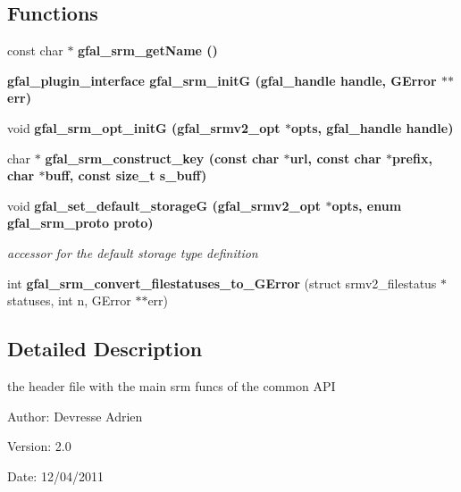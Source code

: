 \subsection*{Functions}
\begin{CompactItemize}
\item 
const char $\ast$ \bf{gfal\_\-srm\_\-get\-Name} ()
\item 
\bf{gfal\_\-plugin\_\-interface} \textbf{gfal\_\-srm\_\-init\-G} (gfal\_\-handle handle, GError $\ast$$\ast$err)\label{gfal__common__srm_8h_27d0d7b427ff691a29a73e147b195c61}

\item 
void \bf{gfal\_\-srm\_\-opt\_\-init\-G} (gfal\_\-srmv2\_\-opt $\ast$opts, gfal\_\-handle handle)
\item 
char $\ast$ \bf{gfal\_\-srm\_\-construct\_\-key} (const char $\ast$url, const char $\ast$prefix, char $\ast$buff, const size\_\-t s\_\-buff)
\item 
void \bf{gfal\_\-set\_\-default\_\-storage\-G} (gfal\_\-srmv2\_\-opt $\ast$opts, enum gfal\_\-srm\_\-proto proto)\label{gfal__common__srm_8h_f14e43f26833cf0fe15518d24b6c5472}

\begin{CompactList}\small\item\em accessor for the default storage type definition \item\end{CompactList}\item 
int \textbf{gfal\_\-srm\_\-convert\_\-filestatuses\_\-to\_\-GError} (struct srmv2\_\-filestatus $\ast$statuses, int n, GError $\ast$$\ast$err)\label{gfal__common__srm_8h_9177e8f96da30fda27c71daead3ff4e8}

\end{CompactItemize}


\subsection{Detailed Description}
the header file with the main srm funcs of the common API 

\begin{Desc}
\item[Author:]Devresse Adrien \end{Desc}
\begin{Desc}
\item[Version:]2.0 \end{Desc}
\begin{Desc}
\item[Date:]12/04/2011 \end{Desc}


